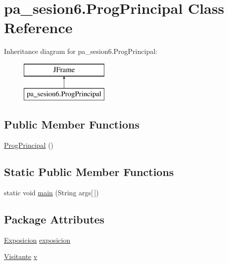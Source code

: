 \hypertarget{classpa__sesion6_1_1_prog_principal}{}\section{pa\+\_\+sesion6.\+Prog\+Principal Class Reference}
\label{classpa__sesion6_1_1_prog_principal}
Inheritance diagram for pa\+\_\+sesion6.\+Prog\+Principal\+:\begin{figure}[H]
\begin{center}
\leavevmode
\includegraphics[height=2.000000cm]{classpa__sesion6_1_1_prog_principal}
\end{center}
\end{figure}
\subsection*{Public Member Functions}
\begin{DoxyCompactItemize}
\item 
\mbox{\hyperlink{classpa__sesion6_1_1_prog_principal_a9df4d17bd1c700512b0f59e19c45edac}{Prog\+Principal}} ()
\end{DoxyCompactItemize}
\subsection*{Static Public Member Functions}
\begin{DoxyCompactItemize}
\item 
static void \mbox{\hyperlink{classpa__sesion6_1_1_prog_principal_a8406d27ef9ec50f44909481a6a4a7741}{main}} (String args\mbox{[}$\,$\mbox{]})
\end{DoxyCompactItemize}
\subsection*{Package Attributes}
\begin{DoxyCompactItemize}
\item 
\mbox{\hyperlink{classpa__sesion6_1_1_exposicion}{Exposicion}} \mbox{\hyperlink{classpa__sesion6_1_1_prog_principal_a1287569c58f606024f2dc4216a267f9e}{exposicion}}
\item 
\mbox{\hyperlink{classpa__sesion6_1_1_visitante}{Visitante}} \mbox{\hyperlink{classpa__sesion6_1_1_prog_principal_a9cdcee1df6de542f0fc8986b02633891}{v}}
\end{DoxyCompactItemize}
